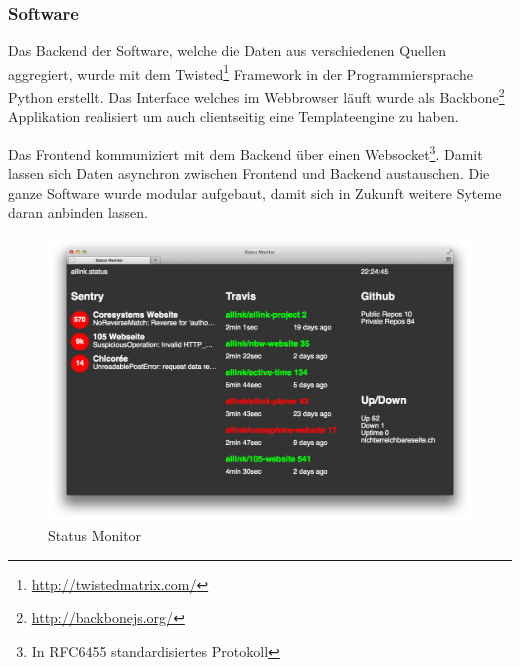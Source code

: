 \subsubsection{Software}
\label{ssub:software}
Das Backend der Software, welche die Daten aus verschiedenen Quellen aggregiert, wurde mit dem Twisted\footnote{\url{http://twistedmatrix.com/}} Framework in der Programmiersprache Python erstellt. Das Interface welches im Webbrowser läuft wurde als Backbone\footnote{\url{http://backbonejs.org/}} Applikation realisiert um auch clientseitig eine Templateengine zu haben.

Das Frontend kommuniziert mit dem Backend über einen Websocket\footnote{In RFC6455 standardisiertes Protokoll}. Damit lassen sich Daten asynchron zwischen Frontend und Backend austauschen. Die ganze Software wurde modular aufgebaut, damit sich in Zukunft weitere Syteme daran anbinden lassen.

\begin{figure}[ht]
\centering
\includegraphics[width=1\textwidth]{images/status_monitor.png}
\caption{Status Monitor}
\label{fig:status_monitor}
\end{figure}
